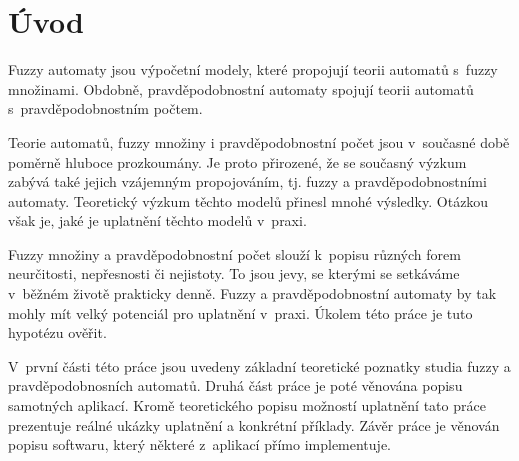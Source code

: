 % 
% 
% 
% 
% 
% 

\section{Úvod}
Fuzzy automaty jsou výpočetní modely, které propojují teorii automatů s~fuzzy množinami. Obdobně, pravděpodobnostní automaty spojují teorii automatů s~pravděpodobnostním počtem.

Teorie automatů, fuzzy množiny i pravděpodobnostní počet jsou v~současné době poměrně hluboce prozkoumány. Je proto přirozené, že se současný výzkum zabývá také jejich vzájemným propojováním, tj. fuzzy a pravděpodobnostními automaty. Teoretický výzkum těchto modelů přinesl mnohé výsledky. Otázkou však je, jaké je uplatnění těchto modelů v~praxi.

Fuzzy množiny a pravděpodobnostní počet slouží k~popisu různých forem neurčitosti, nepřesnosti či nejistoty. To jsou jevy, se kterými se setkáváme v~běžném životě prakticky denně. Fuzzy a pravděpodobnostní automaty by tak mohly mít velký potenciál pro uplatnění v~praxi. Úkolem této práce je tuto hypotézu ověřit.

V~první části této práce jsou uvedeny základní teoretické poznatky studia fuzzy a pravděpodobnosních automatů. Druhá část práce je poté věnována popisu samotných aplikací. Kromě teoretického popisu možností uplatnění tato práce prezentuje reálné ukázky uplatnění a konkrétní příklady. Závěr práce je věnován popisu softwaru, který některé z~aplikací přímo implementuje.


